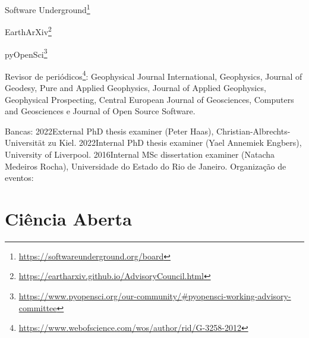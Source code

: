 \documentclass[10pt,a4paper,oneside]{book}
\newcommand{\ResearcherID}{G-3258-2012}
\begin{document}
Software Underground\footnote{\url{https://softwareunderground.org/board}}

EarthArXiv\footnote{\url{https://eartharxiv.github.io/AdvisoryCouncil.html}}

pyOpenSci\footnote{\url{https://www.pyopensci.org/our-community/\#pyopensci-working-advisory-committee}}

Revisor de periódicos\footnote{\url{https://www.webofscience.com/wos/author/rid/\ResearcherID}}:
Geophysical Journal International,
Geophysics,
Journal of Geodesy,
Pure and Applied Geophysics,
Journal of Applied Geophysics,
Geophysical Prospecting,
Central European Journal of Geosciences,
Computers and Geosciences
e
Journal of Open Source Software.

Bancas:
2022External PhD thesis examiner (Peter Haas), Christian-Albrechts-Universität zu Kiel.
2022Internal PhD thesis examiner (Yael Annemiek Engbers), University of Liverpool.
2016Internal MSc dissertation examiner (Natacha Medeiros Rocha), Universidade do Estado do Rio
de Janeiro.
Organização de eventos:

\chapter{Ciência Aberta}
\label{cap_cienciaaberta}
\end{document}
